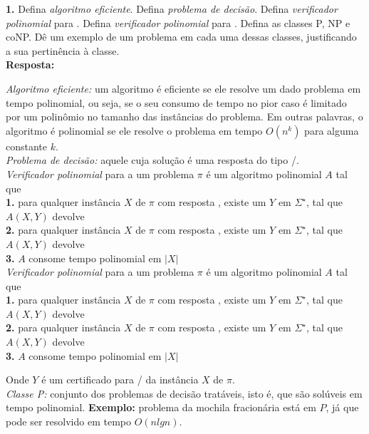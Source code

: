 
\noindent\textbf{1.} Defina \textit{algoritmo eficiente}. Defina \textit{problema de decisão}. Defina \textit{verificador polinomial} para . Defina \textit{verificador polinomial} para . Defina as classes P, NP e coNP. Dê um exemplo de um problema em cada uma dessas classes, justificando a sua pertinência à classe.\\[6pt]
\textbf{Resposta:}

\textit{Algoritmo eficiente:} um algoritmo é eficiente se ele resolve um dado problema em tempo polinomial, ou seja, se o seu consumo de tempo no pior caso é limitado por um polinômio no tamanho das instâncias do problema. Em outras palavras, o algoritmo é polinomial se ele resolve o problema em tempo $O(n^k)$ para alguma constante $k$.\\

\textit{Problema de decisão:} aquele cuja solução é uma resposta do tipo /.\\

\textit{Verificador polinomial} para  a um problema $\pi$ é um algoritmo polinomial $A$ tal que\\
\textbf{1.} para qualquer instância $X$ de $\pi$ com resposta , existe um $Y$ em $\Sigma^\star$, tal que $A(X, Y)$ devolve \\
\textbf{2.} para qualquer instância $X$ de $\pi$ com resposta , existe um $Y$ em $\Sigma^\star$, tal que $A(X, Y)$ devolve \\
\textbf{3.} $A$ consome tempo polinomial em $|X|$\\

\textit{Verificador polinomial} para  a um problema $\pi$ é um algoritmo polinomial $A$ tal que\\
\textbf{1.} para qualquer instância $X$ de $\pi$ com resposta \textcolor{red}{}, existe um $Y$ em $\Sigma^\star$, tal que $A(X, Y)$ devolve \\
\textbf{2.} para qualquer instância $X$ de $\pi$ com resposta \textcolor{red}{}, existe um $Y$ em $\Sigma^\star$, tal que $A(X, Y)$ devolve \\
\textbf{3.} $A$ consome tempo polinomial em $|X|$

Onde $Y$ é um certificado para / da instância $X$ de $\pi$.\\

\textit{Classe P:} conjunto dos problemas de decisão tratáveis, isto é, que são solúveis em tempo polinomial.
\textbf{Exemplo:} problema da mochila fracionária está em $P$, já que pode ser resolvido em tempo $O(n lg n)$.\\

